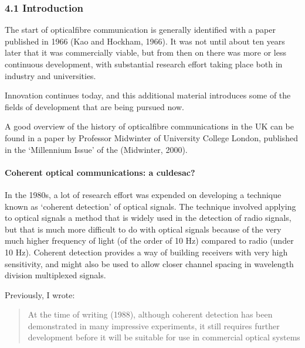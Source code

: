 \documentclass[letterpaper,10pt,english]{sphinxmanual}
\begin{document}
\subsubsection{4.1 Introduction}
\label{\detokenize{content/session_00/Part_00_04:4.1-Introduction}}

The start of optical\sphinxhyphen{}fibre communication is generally identified with a paper published in 1966 (Kao and Hockham, 1966). It was not until about ten years later that it was commercially viable, but from then on there was more or less continuous development, with substantial research effort taking place both in industry and universities.

Innovation continues today, and this additional material introduces some of the fields of development that are being pursued now.

A good overview of the history of optical\sphinxhyphen{}fibre communications in the UK can be found in a paper by Professor Midwinter of University College London, published in the ‘Millennium Issue’ of the  (Midwinter, 2000).


\paragraph{Coherent optical communications: a cul\sphinxhyphen{}de\sphinxhyphen{}sac?}
\label{\detokenize{content/session_00/Part_00_04:Coherent-optical-communications:-a-cul-de-sac?}}
In the 1980s, a lot of research effort was expended on developing a technique known as ‘coherent detection’ of optical signals. The technique involved applying to optical signals a method that is widely used in the detection of radio signals, but that is much more difficult to do with optical signals because of the very much higher frequency of light (of the order of 10 Hz) compared to radio (under 10 Hz). Coherent detection provides a way of building receivers with very high sensitivity, and
might also be used to allow closer channel spacing in wavelength division multiplexed signals.

Previously, I wrote:


\begin{quote}

At the time of writing (1988), although coherent detection has been demonstrated in many impressive experiments, it still requires further development before it will be suitable for use in commercial optical systems
\end{quote}
\end{document}
